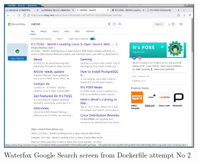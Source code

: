 %

\begin{figure}[!h]
  \centering
   \includegraphics[width=0.9\textwidth]{search.png}
  \caption{Waterfox Google Search screen from Dockerfile attempt No 2}
  \label{fig:search}
\end{figure}

%

